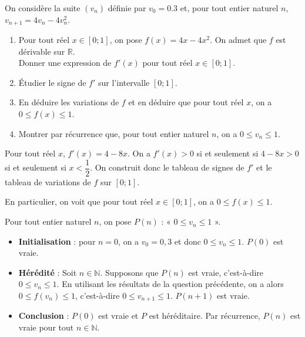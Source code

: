 \documentclass[11pt,fleqn]{book} %
\begin{document}
\begin{exercise}
On considère la suite $(v_n)$ définie par $v_0=0.3$ et, pour tout entier naturel $n$, $v_{n+1}=4v_n-4v_n^2$. 
\begin{enumerate}
\item Pour tout réel $x\in[0;1]$, on pose $f(x)=4x-4x^2$. On admet que $f$ est dérivable sur $\mathbb{R}$.\\ Donner une expression de $f'(x)$ pour tout réel $x\in [0;1]$.
\item Étudier le signe de $f'$ sur l'intervalle $[0;1]$.
\item En déduire les variations de $f$ et en déduire que pour tout réel $x$, on a $0\leqslant f(x) \leqslant 1$.
\item Montrer par récurrence que, pour tout entier naturel $n$, on a $0\leqslant v_n \leqslant 1$. 
\end{enumerate}\end{exercise}
\begin{solution}Pour tout réel $x$, $f'(x)=4-8x$. On a $f'(x) > 0$ si et seulement si $4-8x>0$ si et seulement si $x< \dfrac{1}{2}$. On construit donc le tableau de signes de $f'$ et le tableau de variations de $f$ sur $[0;1]$.

\begin{center}
\end{center}

En particulier, on voit que pour tout réel $x \in [0;1]$, on a $0 \leqslant f(x) \leqslant 1$. 

Pour tout entier naturel $n$, on pose $P(n)$ : « $0 \leqslant v_n\leqslant 1$ ».

\begin{itemize}
\item \textbf{Initialisation} : pour $n=0$, on a $v_0=0,3$ et donc $0 \leqslant v_n\leqslant 1$. $P(0)$ est vraie.
\item \textbf{Hérédité} : Soit $n\in\mathbb{N}$. Supposons que $P(n)$ est vraie, c'est-à-dire $0 \leqslant v_n\leqslant 1$. En utilisant les résultats de la question précédente, on a alors $0\leqslant f(v_n) \leqslant 1$, c'est-à-dire $0 \leqslant v_{n+1}\leqslant 1$. $P(n+1)$ est vraie.
\item \textbf{Conclusion} : $P(0)$ est vraie et $P$ est héréditaire. Par récurrence, $P(n)$ est vraie pour tout $n\in\mathbb{N}$.
\end{itemize}
\end{solution}
\end{document}

